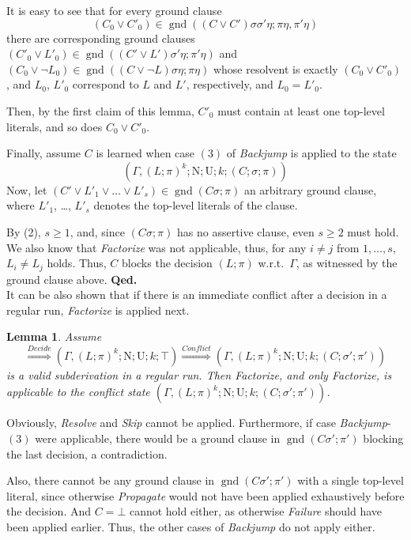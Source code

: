 \documentclass[a4paper]{article}
\newcommand{\mGnd}{\operatorname{gnd}} \newcommand{\mLVar}{\operatorname{lvar}} \newcommand{\mRVar}{\operatorname{rvar}} \newcommand{\mDmn}{\operatorname{dom}} \newcommand{\mRng}{\operatorname{rng}} \newcommand{\mMGU}{\operatorname{mgu}} \newcommand{\mDef}{\operatorname{def}} \newcommand{\mDomain}{\mathcal{D}} \newcommand{\mVar}{\operatorname{var}}
\newcommand{\startproof}{{\bf Proof:~}}
\newcommand{\finishproof}{{\bf Qed.}}
\newcommand{\leaveabit}{\\[6 pt]}
\newtheorem{lemm}[defi]{Lemma}
\begin{document}
It is easy to see that for every ground clause 
\[(C_0 \lor C'_0) \in \mGnd((C \lor C')\sigma\sigma'\eta; \pi\eta, \pi'\eta)\]
there are corresponding ground clauses $(C'_0 \lor L'_0) \in \mGnd((C'\lor L')\sigma'\eta; \pi'\eta)$ and 
$(C_0 \lor \neg L_0) \in \mGnd((C \lor \neg L)\sigma\eta; \pi\eta)$ 
whose resolvent is exactly $(C_0 \lor C'_0)$, 
and $L_0$, $L'_0$ correspond to $L$ and $L'$, respectively, and $L_0 = L'_0$.

Then, by the first claim of this lemma, $C'_0$ must contain at least one top-level literals, and so does $C_0 \lor C'_0$.

Finally, assume $C$ is learned when case $(3)$ of \emph{Backjump} is applied to the state
\[(\Gamma, (L; \pi)^k; \text{N}; \text{U}; k; (C; \sigma; \pi))\]
Now, let $(C' \lor L'_1 \lor \dots \lor L'_s) \in \mGnd(C\sigma; \pi)$ an arbitrary ground clause, 
where $L'_1$, \dots, $L'_s$ denotes the top-level literals of the clause.

By (2), $s \geq 1$, and, since $(C\sigma; \pi)$ has no assertive clause, even $s \geq 2$ must hold. 
We also know that \emph{Factorize} was not applicable, thus, for any $i \ne j$ from $1, \dots, s$, 
$L_i \ne L_j$ holds.
Thus, $C$ blocks the decision $(L; \pi)$ w.r.t.\
$\Gamma$, as witnessed by the ground clause above.
\finishproof\leaveabit
\indent
It can be also shown that if there is an immediate conflict after a decision in a regular run, \emph{Factorize} is applied next.

\begin{lemm}\label{lemmImmConfFact} Assume 
\[
\stackrel{Decide}{\Rightarrow}
(\Gamma, (L; \pi)^{k}; \text{N}; \text{U}; k; \top)
\stackrel{Conflict}{\Rightarrow}
(\Gamma, (L; \pi)^{k}; \text{N}; \text{U}; k; (C; \sigma'; \pi'))
\]
is a valid subderivation in a regular run. 
Then \emph{Factorize}, and only \emph{Factorize}, is applicable to the conflict state $(\Gamma, (L; \pi)^{k}; \text{N}; \text{U}; k; (C; \sigma'; \pi'))$.
\end{lemm}
\noindent\startproof
Obviously, \emph{Resolve} and \emph{Skip} cannot be applied. 
Furthermore, if case \emph{Backjump}-$(3)$ were applicable, 
there would be a ground clause in $\mGnd(C\sigma';\pi')$ 
blocking the last decision, a contradiction. 

Also, there cannot be any ground clause in $\mGnd(C\sigma';\pi')$ with a single top-level literal, since otherwise \emph{Propagate} would not have been applied exhaustively 
before the decision. And $C = \bot$ cannot hold either, as otherwise \emph{Failure} should have been applied earlier. 
Thus, the other cases of \emph{Backjump} do not apply either.
\end{document}
